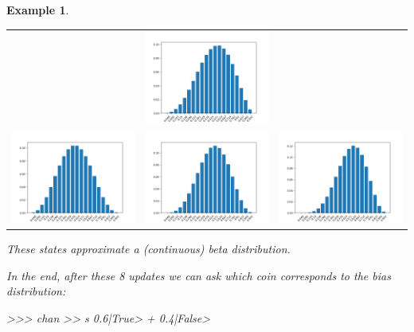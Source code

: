 \documentclass[leqno]{tufte-book} %
\newtheorem{example}[theorem]{Example}
\begin{document}
\begin{example}
\begin{center}
\begin{tabular}{ccc}
&
\includegraphics[width=15em]{Pictures/disc_coin_parameter-5.png}
\\
\includegraphics[width=15em]{Pictures/disc_coin_parameter-6.png} 
&
\includegraphics[width=15em]{Pictures/disc_coin_parameter-7.png}
&
\includegraphics[width=15em]{Pictures/disc_coin_parameter-8.png}
\end{tabular}
\end{center}

\noindent These states approximate a (continuous) beta
distribution.

In the end, after these 8 updates we can ask which coin corresponds to
the bias distribution:
\begin{python}
>>> chan >> s
0.6|True> + 0.4|False>
\end{python}


\end{example}
\end{document}
